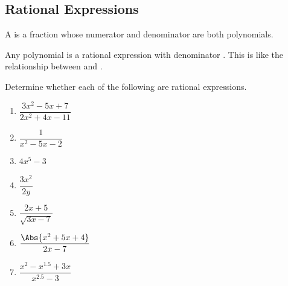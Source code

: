 \subsection{Rational Expressions} 
\begin{definition}
A  is a fraction whose numerator and denominator are both polynomials.
\end{definition}
\begin{Note}Any polynomial is a rational expression with denominator \makeblanksmall. This is like the relationship between \makeblank[1in] and \makeblank.\end{Note}
\begin{Example}
Determine whether each of the following are rational expressions.
\begin{enumerate}\setabc
\item $\dfrac{3x^2-5x+7}{2x^2+4x-11}$\makeblanknew
\item $\dfrac{1}{x^2-5x-2}$\makeblanknew
\item $4x^5-3$\makeblanknew
\item $\dfrac{3x^2}{2y}$\makeblanknew
\item $\dfrac{2x+5}{\sqrt{3x-7}}$\makeblanknew
\item $\dfrac{\Abs{x^2+5x+4}}{2x-7}$\makeblanknew
\item $\dfrac{x^2-x^{1.5}+3x}{x^{2.5}-3}$\makeblanknew
\end{enumerate}
\end{Example}